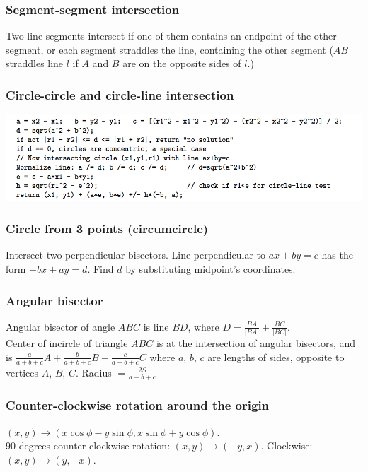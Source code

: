 \documentclass[a4paper,12pt]{article}
\begin{document}
\subsubsection{Segment-segment intersection}
Two line segments intersect if one of them contains an endpoint of the other segment, or each segment straddles the line, containing the other segment ($AB$ straddles line $l$ if $A$ and $B$ are on the opposite sides of $l$.)

\subsubsection{Circle-circle and circle-line intersection}
 \includegraphics[scale=.7]{geometry/candc.png}

\subsubsection{Circle from 3 points (circumcircle)}
Intersect two perpendicular bisectors. Line perpendicular to $ax + by = c$ has the form $-bx + ay = d$. Find $d$ by substituting midpoint’s coordinates.

\subsubsection{Angular bisector}
Angular bisector of angle $ABC$ is line $BD$, where $D = \frac{BA}{|BA|} + \frac{BC}{|BC|}$.\\
Center of incircle of triangle $ABC$ is at the intersection of angular bisectors, and is $\frac{a}{a+b+c}A + \frac{b}{a+b+c}B + \frac{c}{a+b+c}C$
where $a$, $b$, $c$ are lengths of sides, opposite to vertices $A$, $B$, $C$. Radius $= \frac{2S}{a+b+c}$

\subsubsection{Counter-clockwise rotation around the origin}
$(x,y) \rightarrow (x\cos\phi - y\sin\phi, x \sin\phi + y \cos\phi)$.\\
90-degrees counter-clockwise rotation: $(x,y) \rightarrow (-y,x)$. Clockwise: $(x,y) \rightarrow (y,-x)$.
\end{document}
